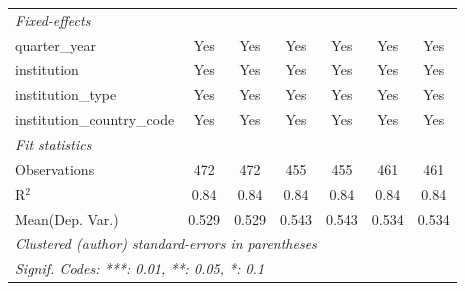 \begin{tabular}{lcccccc}
   \midrule
   \emph{Fixed-effects}\\
   quarter\_year                      & Yes          & Yes         & Yes     & Yes        & Yes        & Yes\\  
   institution                        & Yes          & Yes         & Yes     & Yes        & Yes        & Yes\\  
   institution\_type                  & Yes          & Yes         & Yes     & Yes        & Yes        & Yes\\  
   institution\_country\_code         & Yes          & Yes         & Yes     & Yes        & Yes        & Yes\\  
   \midrule
   \emph{Fit statistics}\\
   Observations                       & 472          & 472         & 455     & 455        & 461        & 461\\  
   R$^2$                              & 0.84         & 0.84        & 0.84    & 0.84       & 0.84       & 0.84\\  
Mean(Dep. Var.) & 0.529 & 0.529 & 0.543 & 0.543 & 0.534 & 0.534 \\
   \midrule \midrule
   \multicolumn{7}{l}{\emph{Clustered (author) standard-errors in parentheses}}\\
   \multicolumn{7}{l}{\emph{Signif. Codes: ***: 0.01, **: 0.05, *: 0.1}}\\
\end{tabular}
\par\endgroup

